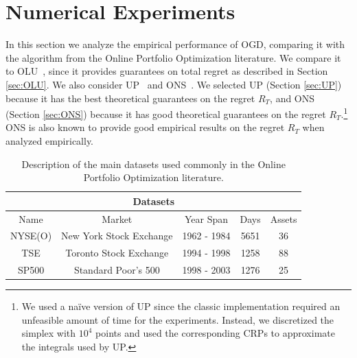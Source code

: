 \chapter{Numerical Experiments} 
\label{ch:experiments}

In this section we analyze the empirical performance of OGD, comparing it with the algorithm from the Online Portfolio Optimization literature. We compare it to OLU~\cite{das2013online}, since it provides guarantees on total regret as described in Section \ref{sec:OLU}.
We also consider UP~\cite{cover1996universal} and ONS~\cite{agarwal2006algorithms}.
We selected UP (Section \ref{sec:UP}) because it has the best theoretical guarantees on the regret $R_T$, and ONS (Section \ref{sec:ONS}) because it has good theoretical guarantees on the regret $R_T$.\footnote{
We used a na\"ive version of UP since the classic implementation required an unfeasible amount of time for the experiments.
Instead, we discretized the simplex with $10^4$ points and used the corresponding CRPs to approximate the integrals used by UP.} ONS is also known to provide good empirical results on the regret $R_T$ when analyzed empirically.

\begin{table}[ht!]\centering\small
\begin{tabular}{ |c||c|c|c|c| }
 \hline
 \multicolumn{5}{|c|}{Datasets} \\
 \hline
 Name & Market &Year Span & Days & Assets\\
 \hline
 NYSE(O) & New York Stock Exchange  & 1962 - 1984  &5651&   36\\
 TSE & Toronto Stock Exchange & 1994 - 1998  & 1258   &88\\
 SP500 & Standard Poor's 500 & 1998 - 2003 & 1276&  25\\
 \hline
\end{tabular}
\caption{Description of the main datasets used commonly in the Online Portfolio Optimization literature.}\label{tab:dataset}
\end{table}


